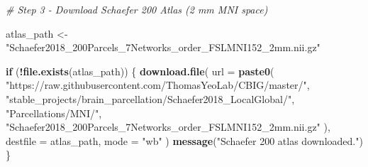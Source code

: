 \documentclass[
]{article}
\newenvironment{Shaded}{\begin{snugshade}}{\end{snugshade}}
\newcommand{\AttributeTok}[1]{\textcolor[rgb]{0.13,0.29,0.53}{#1}}
\newcommand{\CommentTok}[1]{\textcolor[rgb]{0.56,0.35,0.01}{\textit{#1}}}
\newcommand{\ControlFlowTok}[1]{\textcolor[rgb]{0.13,0.29,0.53}{\textbf{#1}}}
\newcommand{\FunctionTok}[1]{\textcolor[rgb]{0.13,0.29,0.53}{\textbf{#1}}}
\newcommand{\NormalTok}[1]{#1}
\newcommand{\OtherTok}[1]{\textcolor[rgb]{0.56,0.35,0.01}{#1}}
\newcommand{\SpecialCharTok}[1]{\textcolor[rgb]{0.81,0.36,0.00}{\textbf{#1}}}
\newcommand{\StringTok}[1]{\textcolor[rgb]{0.31,0.60,0.02}{#1}}
\begin{document}
\begin{Shaded}
\begin{Highlighting}[]
\CommentTok{\# Step 3 {-} Download Schaefer 200 Atlas (2 mm MNI space) }

\NormalTok{atlas\_path }\OtherTok{\textless{}{-}} \StringTok{"Schaefer2018\_200Parcels\_7Networks\_order\_FSLMNI152\_2mm.nii.gz"}

\ControlFlowTok{if}\NormalTok{ (}\SpecialCharTok{!}\FunctionTok{file.exists}\NormalTok{(atlas\_path)) \{}
  \FunctionTok{download.file}\NormalTok{(}
    \AttributeTok{url =} \FunctionTok{paste0}\NormalTok{(}
      \StringTok{"https://raw.githubusercontent.com/ThomasYeoLab/CBIG/master/"}\NormalTok{,}
      \StringTok{"stable\_projects/brain\_parcellation/Schaefer2018\_LocalGlobal/"}\NormalTok{,}
      \StringTok{"Parcellations/MNI/"}\NormalTok{,}
      \StringTok{"Schaefer2018\_200Parcels\_7Networks\_order\_FSLMNI152\_2mm.nii.gz"}
\NormalTok{    ),}
    \AttributeTok{destfile =}\NormalTok{ atlas\_path,}
    \AttributeTok{mode =} \StringTok{"wb"}
\NormalTok{  )}
  \FunctionTok{message}\NormalTok{(}\StringTok{"Schaefer 200 atlas downloaded."}\NormalTok{)}
\NormalTok{\}}
\end{Highlighting}
\end{Shaded}
\end{document}
